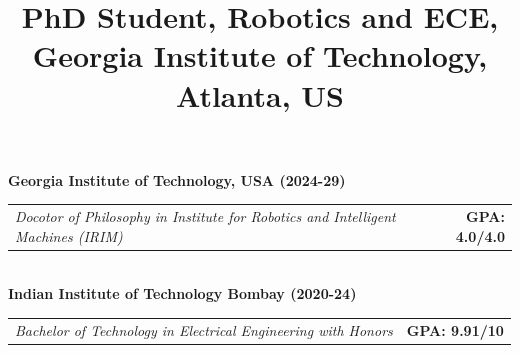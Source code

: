 \documentclass[10pt,letterpaper,sans]{moderncv}        %
\title{
\small{PhD Student, Robotics and ECE, Georgia Institute of Technology, Atlanta, US}}
\newcommand\x{1}
\begin{document}

\makecvhead
\vspace{-0.75cm}
\vspace{\x pt}
\vspace{-0.20 cm}
\textbf{{Georgia Institute of Technology, USA} \hfill {\textbf{(2024-29)}}}\\
\begin{tabular}{p{} r}
     \textit{Docotor of Philosophy in Institute for Robotics and Intelligent Machines (IRIM)
} & \textbf{GPA: 4.0/4.0}\\
    
\end{tabular}\\
\textbf{{Indian Institute of Technology Bombay} \hfill {\textbf{(2020-24)}}}\\
\begin{tabular}{p{} r}
     \textit{Bachelor of Technology in Electrical Engineering with Honors} &  \textbf{GPA: 9.91/10}\\
    
\end{tabular}
\\
\end{document}
